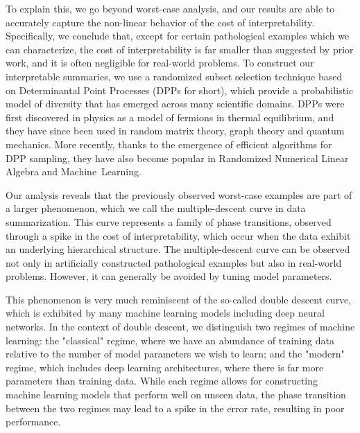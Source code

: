 \documentclass[11pt, oneside]{article}   	%
\begin{document}

To explain this, we go beyond worst-case analysis, and our results are
able to accurately capture the non-linear behavior of the cost of
interpretability. Specifically, we conclude that, except for certain
pathological examples which we can characterize, the cost of
interpretability is far smaller than suggested by prior work, and it
is often negligible for real-world problems. To construct our
interpretable summaries, we use a randomized subset selection
technique based on Determinantal Point Processes (DPPs for short), which provide
a probabilistic model of diversity that has emerged across many scientific domains.
DPPs were first discovered in physics as a model of fermions in thermal
equilibrium, and they have since been used in random matrix theory, graph
theory and quantum mechanics. More recently, thanks to the emergence
of efficient algorithms for DPP sampling, they have also become
popular in Randomized Numerical Linear Algebra and Machine~Learning.

Our analysis reveals that
the previously observed worst-case examples are part of a larger
phenomenon, which we call the multiple-descent curve in data
summarization.  This curve represents a family of phase transitions,
observed through a spike in the cost of interpretability, which occur
when the data exhibit an underlying hierarchical structure. The
multiple-descent curve can be observed not only in artificially
constructed pathological examples but also in real-world
problems. However, it can generally be avoided by tuning model
parameters. 

This phenomenon is very much reminiscent of the so-called double
descent curve, which is exhibited by many machine learning models
including deep neural networks. In the context of double descent, we
distinguish two regimes of machine learning: the "classical" regime,
where we have an abundance of training data relative to the number of
model parameters we wish to learn; and the "modern" regime, which
includes deep learning architectures, where there is far more
parameters than training data. While each regime allows for
constructing machine learning models that perform well on unseen data,
the phase transition between the two regimes may lead to a spike in
the error rate, resulting in poor performance. 
\end{document}
